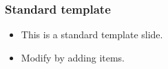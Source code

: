 \begin{frame}[fragile]
\frametitle{Standard template}
\begin{itemize}
\item This is a standard template slide.
\item Modify by adding items.
\end{itemize}

\end{frame}